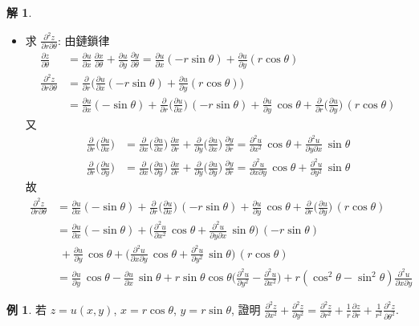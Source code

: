 \documentclass[12pt]{extarticle}
\newcommand{\ds}{\displaystyle}
\theoremstyle{definition}
\newtheorem*{ex}{例}
\newtheorem*{sol}{解}
\newcommand{\pdiff}[2]{\frac{\partial #1}{\partial #2}}
\newcommand{\pdifft}[2]{\frac{\partial^2 #1}{\partial #2^2}}
\begin{document}
\begin{sol}
\begin{itemize}
    \item 求 $\ds\frac{\partial^2 z}{\partial r\partial\theta}$: 由鏈鎖律
  \begin{align*}
    \pdiff{z}{\theta} &= \pdiff{u}{x}\,\pdiff{x}{\theta} + \pdiff{u}{y}\,\pdiff{y}{\theta} = \pdiff{u}{x}(-r\sin\theta) + \pdiff{u}{y}(r\cos\theta) \\
    \frac{\partial^2 z}{\partial r\partial\theta} &= \pdiff{}{r}\bigg(\pdiff{u}{x}(-r\sin\theta) + \pdiff{u}{y}(r\cos\theta)\bigg) \\ &= \pdiff{u}{x}(-\sin\theta) + \pdiff{}{r}\bigg(\pdiff{u}{x}\bigg)\,(-r\sin\theta) + \pdiff{u}{y}\,\cos\theta + \pdiff{}{r}\bigg(\pdiff{u}{y}\bigg)\,(r\cos\theta)
  \end{align*}
  又
  \begin{align*}
    \pdiff{}{r}\bigg(\pdiff{u}{x}\bigg) &= \pdiff{}{x}\bigg(\pdiff{u}{x}\bigg)\,\pdiff{x}{r} + \pdiff{}{y}\bigg(\pdiff{u}{x}\bigg)\,\pdiff{y}{r} = \pdifft{u}{x}\,\cos\theta + \frac{\partial^2 u}{\partial y\partial x}\,\sin\theta \\
    \pdiff{}{r}\bigg(\pdiff{u}{y}\bigg) &= \pdiff{}{x}\bigg(\pdiff{u}{y}\bigg)\,\pdiff{x}{r} + \pdiff{}{y}\bigg(\pdiff{u}{y}\bigg)\,\pdiff{y}{r} = \frac{\partial^2 u}{\partial x\partial y}\,\cos\theta + \pdifft{u}{y}\,\sin\theta
  \end{align*}
  故
  \begin{align*}
    \frac{\partial^2 z}{\partial r\partial\theta} &= \pdiff{u}{x}(-\sin\theta) + \pdiff{}{r}\bigg(\pdiff{u}{x}\bigg)\,(-r\sin\theta) + \pdiff{u}{y}\,\cos\theta + \pdiff{}{r}\bigg(\pdiff{u}{y}\bigg)\,(r\cos\theta)\\
    &= \pdiff{u}{x}(-\sin\theta) + \bigg(\pdifft{u}{x}\,\cos\theta + \frac{\partial^2 u}{\partial y\partial x}\,\sin\theta\bigg)\,(-r\sin\theta) \\ &\;+ \pdiff{u}{y}\,\cos\theta + \bigg(\frac{\partial^2 u}{\partial x\partial y}\,\cos\theta + \pdifft{u}{y}\,\sin\theta\bigg)\,(r\cos\theta) \\
    &= \pdiff{u}{y}\,\cos\theta - \pdiff{u}{x}\,\sin\theta + r\sin\theta\cos\theta\bigg(\pdifft{u}{y} - \pdifft{u}{x}\bigg) + r(\cos^2\theta - \sin^2\theta)\frac{\partial^2 u}{\partial x\partial y}
  \end{align*}
  \end{itemize}
\end{sol}

\begin{ex}
  若 $\ds z = u(x, y)$, $\ds x = r\cos\theta$, $\ds y = r\sin\theta$, 證明 $\ds\pdifft{z}{x} + \pdifft{z}{y} = \pdifft{z}{r} + \frac{1}{r}\pdiff{z}{r} + \frac{1}{r^2}\pdifft{z}{\theta}$. 
\end{ex}
\end{document}
